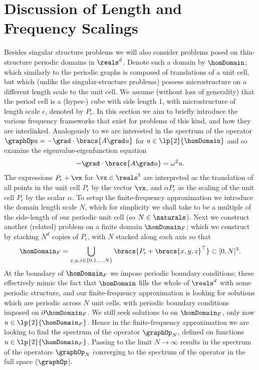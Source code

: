 \section{Discussion of Length and Frequency Scalings} \label{sec:FreqApproxes}
Besides singular structure problems we will also consider problems posed on thin-structure periodic domains in $\reals^{d}$.
Denote such a domain by $\homDomain$; which similarly to the periodic graphs is composed of translations of a unit cell, but which (unlike the singular-structure problems) possess microstructure on a different length scale to the unit cell.
We assume (without loss of generality) that the period cell is a (hyper-) cube with side length 1, with microstructure of length scale $\epsilon$, denoted by $P_{\epsilon}$. 
In this section we aim to briefly introduce the various frequency frameworks that exist for problems of this kind, and how they are interlinked.
Analogously to  we are interested in the spectrum of the operator $\graphOp u = -\grad\cdot\bracs{A\grad u}$ for $u\in\lp{2}{\homDomain}$ and so examine the eigenvalue-eigenfunction equation 
\begin{align} \label{eq:AsymExample}
	-\grad\cdot\bracs{A\grad u} = \omega^{2}u.
\end{align}
The expressions $P_{\epsilon} + \vx$ for $\vx\in\reals^{3}$ are interpreted as the translation of all points in the unit cell $P_{\epsilon}$ by the vector $\vx$, and $\alpha P_{\epsilon}$ as the scaling of the unit cell $P_{\epsilon}$ by the scalar $\alpha$.
To setup the finite-frequency approximation we introduce the domain length scale $N$, which for simplicity we shall take to be a multiple of the side-length of our periodic unit cell (so $N\in\naturals$).
Next we construct another (related) problem on a finite domain $\homDomain_{F}$; which we construct by stacking $N^{d}$ copies of $P_{\epsilon}$, with $N$ stacked along each axis so that
\begin{align*}
	\homDomain_{F} =\bigcup_{x,y,z\in\{0,1,...,N\}}\bracs{P_{\epsilon} + \bracs{x,y,z}^{\top}}\subset [0,N]^{3}.
\end{align*}
At the boundary of $\homDomain_{F}$ we impose periodic boundary conditions; these effectively mimic the fact that $\homDomain$ fills the whole of $\reals^{d}$ with some periodic structure, and our finite-frequency approximation is looking for solutions which are periodic across $N$ unit cells.
with periodic boundary conditions imposed on $\partial\homDomain_{F}$.
We still seek solutions to  on $\homDomain_{F}$, only now $u\in\lp{2}{\homDomain_{F}}$.
Hence in the finite-frequency approximation we are looking to find the spectrum of the operator $\graphOp_{N}$, defined on functions $u\in\lp{2}{\homDomain_{F}}$.
Passing to the limit $N\rightarrow\infty$ results in the spectrum of the operators $\graphOp_{N}$ converging to the spectrum of the operator in the full space ($\graphOp$). \newline

